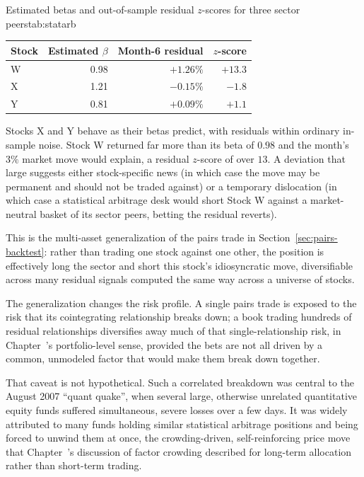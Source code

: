 \documentclass[../ai_in_finance]{subfiles}
\begin{document}
\begin{booktable}[htbp]{Estimated betas and out-of-sample residual $z$-scores for three sector peers}{tab:statarb}
\begin{tabular}{lrrr}
\toprule
Stock & Estimated $\beta$ & Month-6 residual & $z$-score \\
\midrule
W & 0.98 & $+1.26\%$ & $+13.3$ \\
X & 1.21 & $-0.15\%$ & $-1.8$ \\
Y & 0.81 & $+0.09\%$ & $+1.1$ \\
\bottomrule
\end{tabular}
\end{booktable}

Stocks X and Y behave as their betas predict, with residuals within ordinary in-sample noise. Stock W returned far more than its beta of $0.98$ and the month's $3\%$ market move would explain, a residual $z$-score of over $13$. A deviation that large suggests either stock-specific news (in which case the move may be permanent and should not be traded against) or a temporary dislocation (in which case a statistical arbitrage desk would short Stock W against a market-neutral basket of its sector peers, betting the residual reverts).

This is the multi-asset generalization of the pairs trade in Section~\ref{sec:pairs-backtest}: rather than trading one stock against one other, the position is effectively long the sector and short this stock's idiosyncratic move, diversifiable across many residual signals computed the same way across a universe of stocks.

The generalization changes the risk profile. A single pairs trade is exposed to the risk that its cointegrating relationship breaks down; a book trading hundreds of residual relationships diversifies away much of that single-relationship risk, in Chapter~'s portfolio-level sense, provided the bets are not all driven by a common, unmodeled factor that would make them break down together.

That caveat is not hypothetical. Such a correlated breakdown was central to the August 2007 ``quant quake'', when several large, otherwise unrelated quantitative equity funds suffered simultaneous, severe losses over a few days. It was widely attributed to many funds holding similar statistical arbitrage positions and being forced to unwind them at once, the crowding-driven, self-reinforcing price move that Chapter~'s discussion of factor crowding described for long-term allocation rather than short-term trading.
\end{document}
